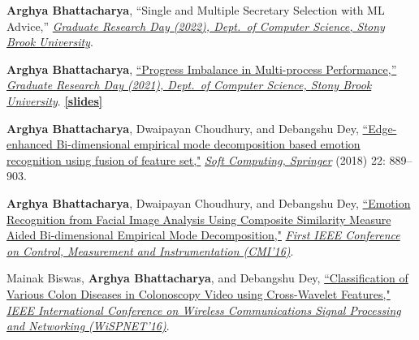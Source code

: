 \documentclass[letterpaper,11pt]{article}
\begin{document}
\item \label{paper:grd22} {\textbf{Arghya Bhattacharya},
{``Single and Multiple Secretary Selection with ML Advice,''} \href{https://www3.cs.stonybrook.edu/~grd/index.html}{\textit{Graduate Research Day (2022), Dept.\ of Computer Science, Stony Brook University}}.}

\item \label{paper:grd21} {\textbf{Arghya Bhattacharya},
\href{https://www3.cs.stonybrook.edu/~grd/posters/GRD_2021_Poster_Arghya_Bhattacharya.pdf}{``Progress Imbalance in Multi-process Performance,''} \href{https://www3.cs.stonybrook.edu/~grd/GRD-2021/program.html}{\textit{Graduate Research Day (2021), Dept.\ of Computer Science, Stony Brook University}}. \href{https://github.com/ArghyaB118/Multiprocess_Performance/blob/main/Arghya_GRD_2021_slides.pdf}{\textbf{[slides]}}}

\item \label{paper:softc18} {\textbf{Arghya Bhattacharya}, Dwaipayan Choudhury, and Debangshu Dey, \href{https://doi.org/10.1007/s00500-016-2395-4}{``Edge-enhanced Bi-dimensional empirical mode decomposition based emotion recognition using fusion of feature set,"} \href{https://www.springer.com/journal/500}{\textit{Soft Computing, Springer}} (2018) 22: 889--903.}

\item \label{paper:cmi16} {\textbf{Arghya Bhattacharya}, Dwaipayan Choudhury, and Debangshu Dey, \href{https://doi.org/10.1109/CMI.2016.7413766}{``Emotion Recognition from Facial Image Analysis Using Composite Similarity Measure Aided Bi-dimensional Empirical Mode Decomposition,"} \href{https://ieeexplore.ieee.org/xpl/conhome/7400053/proceeding}{\textit{First IEEE Conference on Control, Measurement and Instrumentation (CMI’16)}}.}

\item \label{paper:wispnet16} {Mainak Biswas, \textbf{Arghya Bhattacharya}, and Debangshu Dey, \href{https://doi.org/10.1109/WiSPNET.2016.7566521} {``Classification of Various Colon Diseases in Colonoscopy Video using Cross-Wavelet Features,"} \href{https://ieeexplore.ieee.org/xpl/conhome/7561562/proceeding}{\textit{IEEE International Conference on Wireless Communications Signal Processing and Networking (WiSPNET'16)}}.}
\resumePublicationListEnd
\end{document}
